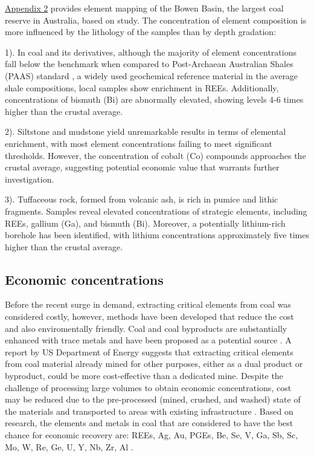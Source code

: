 \documentclass[11pt,a4paper,]{article}
\begin{document}
\hyperref[sec-appendixtwo]{Appendix 2} provides element mapping of the Bowen Basin, the largest coal reserve in Australia, based on \textcite{Hodgkinson2020} study. The concentration of element composition is more influenced by the lithology of the samples than by depth gradation:

1). In coal and its derivatives, although the majority of element concentrations fall below the benchmark when compared to Post-Archaean Australian Shales (PAAS) standard \autocite{McLennan2011}, a widely used geochemical reference material in the average shale compositions, local samples show enrichment in REEs. Additionally, concentrations of bismuth (Bi) are abnormally elevated, showing levels 4-6 times higher than the crustal average.

2). Siltstone and mudstone yield unremarkable results in terms of elemental enrichment, with most element concentrations failing to meet significant thresholds. However, the concentration of cobalt (Co) compounds approaches the crustal average, suggesting potential economic value that warrants further investigation.

3). Tuffaceous rock, formed from volcanic ash, is rich in pumice and lithic fragments. Samples reveal elevated concentrations of strategic elements, including REEs, gallium (Ga), and bismuth (Bi). Moreover, a potentially lithium-rich borehole has been identified, with lithium concentrations approximately five times higher than the crustal average.

\subsection{Economic concentrations}\label{economic-concentrations}

Before the recent surge in demand, extracting critical elements from coal was considered costly, however, methods have been developed that reduce the cost and also enviromentally friendly. Coal and coal byproducts are substantially enhanced with trace metals and have been proposed as a potential source \autocite{Eterigho2021}. A report by US Department of Energy suggests that extracting critical elements from coal material already mined for other purposes, either as a dual product or byproduct, could be more cost-effective than a dedicated mine. Despite the challenge of processing large volumes to obtain economic concentrations, cost may be reduced due to the pre-processed (mined, crushed, and washed) state of the materials and transported to areas with existing infrastructure \autocite{usde2017,Hodgkinson2021}. Based on research, the elements and metals in coal that are considered to have the best chance for economic recovery are: REEs, Ag, Au, PGEs, Be, Se, V, Ga, Sb, Sc, Mo, W, Re, Ge, U, Y, Nb, Zr, Al \autocite{DAI2018155}.
\end{document}
